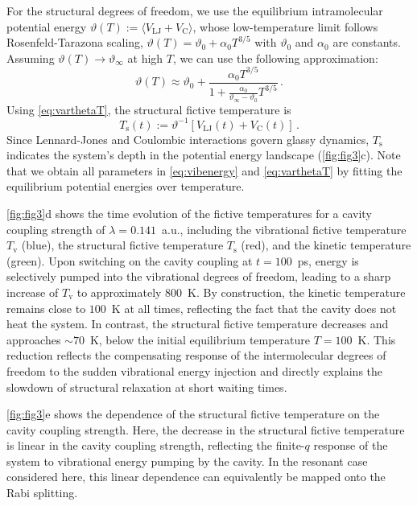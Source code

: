 \documentclass[aps, prl,
 reprint,
 superscriptaddress,
 citeautoscript,  %
 amsmath,amssymb,
 tightenlines
]{revtex4-2}
\begin{document}
For the structural degrees of freedom, we use the equilibrium intramolecular potential energy $\vartheta(T) :=\langle V_\mathrm{LJ}+V_\mathrm{C}\rangle$, whose low-temperature limit follows Rosenfeld-Tarazona scaling, $\vartheta(T) = \vartheta_0+\alpha_0 T^{3/5}$ with $\vartheta_0$ and $\alpha_0$ are constants. \cite{rosenfeld1998density} 
Assuming $\vartheta(T) \to \vartheta_\infty$ at high $T$, we can use the following approximation: %
\begin{equation}
\vartheta(T) \approx \vartheta_0+\frac{\alpha_0 T^{3/5}}{1+\frac{\alpha_0}{\vartheta_\infty-\vartheta_0}T^{3/5}} \,. \label{eq:varthetaT}
\end{equation}
Using \cref{eq:varthetaT},  the structural fictive temperature is
\begin{equation}
T_\mathrm{s}(t) := \vartheta^{-1}[V_\mathrm{LJ}(t)+V_\mathrm{C}(t)] \,. \label{eq:ts}
\end{equation}
Since Lennard-Jones and Coulombic interactions govern glassy dynamics, $T_\mathrm{s}$ indicates the system's depth in the potential energy landscape (\cref{fig:fig3}c). Note that we obtain all parameters in \cref{eq:vibenergy} and \cref{eq:varthetaT} by fitting the equilibrium potential energies over temperature.


\cref{fig:fig3}d shows the time evolution of the fictive temperatures for a cavity coupling strength of $\lambda = 0.141$~a.u., including the vibrational fictive temperature $T_\mathrm{v}$ (blue), the structural fictive temperature $T_\mathrm{s}$ (red), and the kinetic temperature (green). Upon switching on the cavity coupling at $t = 100$~ps, energy is selectively pumped into the vibrational degrees of freedom, leading to a sharp increase of $T_\mathrm{v}$ to approximately $800$~K. By construction, the kinetic temperature remains close to $100$~K at all times, reflecting the fact that the cavity does not heat the system.  In contrast, the structural fictive temperature decreases and approaches $\sim 70$~K, below the initial equilibrium temperature $T = 100$~K. This reduction reflects the compensating response of the intermolecular degrees of freedom to the sudden vibrational energy injection and directly explains the slowdown of structural relaxation at short waiting times.

\cref{fig:fig3}e shows the dependence of the structural fictive temperature on the cavity coupling strength. Here, the decrease in the structural fictive temperature is linear in the cavity coupling strength, reflecting the finite-$q$ response of the system to vibrational energy pumping by the cavity. In the resonant case considered here, this linear dependence can equivalently be mapped onto the Rabi splitting.
\end{document}
